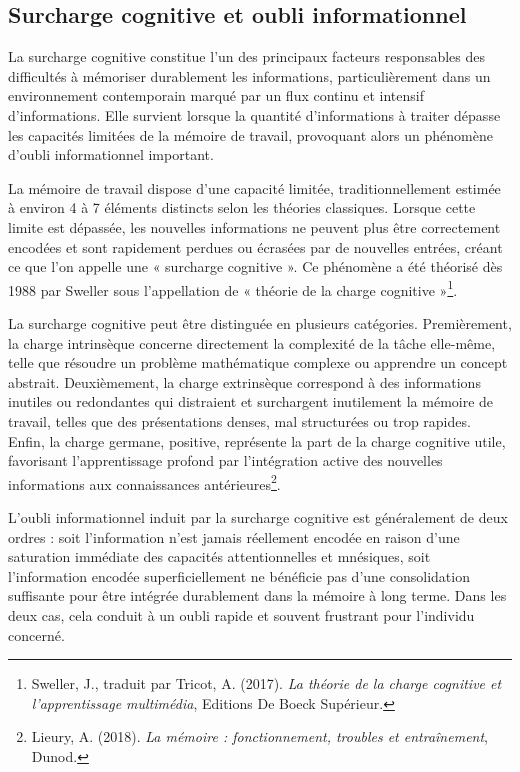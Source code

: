 \documentclass[11pt,a4paper]{report}
\begin{document}
\subsection{Surcharge cognitive et oubli informationnel}
La surcharge cognitive constitue l’un des principaux facteurs responsables des difficultés à mémoriser durablement les informations, particulièrement dans un environnement contemporain marqué par un flux continu et intensif d’informations. Elle survient lorsque la quantité d’informations à traiter dépasse les capacités limitées de la mémoire de travail, provoquant alors un phénomène d’oubli informationnel important.

La mémoire de travail dispose d’une capacité limitée, traditionnellement estimée à environ 4 à 7 éléments distincts selon les théories classiques. Lorsque cette limite est dépassée, les nouvelles informations ne peuvent plus être correctement encodées et sont rapidement perdues ou écrasées par de nouvelles entrées, créant ce que l'on appelle une « surcharge cognitive ». Ce phénomène a été théorisé dès 1988 par Sweller sous l’appellation de « théorie de la charge cognitive »\footnote{Sweller, J., traduit par Tricot, A. (2017). \textit{La théorie de la charge cognitive et l'apprentissage multimédia}, Editions De Boeck Supérieur.}.

La surcharge cognitive peut être distinguée en plusieurs catégories. Premièrement, la charge intrinsèque concerne directement la complexité de la tâche elle-même, telle que résoudre un problème mathématique complexe ou apprendre un concept abstrait. Deuxièmement, la charge extrinsèque correspond à des informations inutiles ou redondantes qui distraient et surchargent inutilement la mémoire de travail, telles que des présentations denses, mal structurées ou trop rapides. Enfin, la charge germane, positive, représente la part de la charge cognitive utile, favorisant l’apprentissage profond par l’intégration active des nouvelles informations aux connaissances antérieures\footnote{Lieury, A. (2018). \textit{La mémoire : fonctionnement, troubles et entraînement}, Dunod.}.

L'oubli informationnel induit par la surcharge cognitive est généralement de deux ordres : soit l’information n’est jamais réellement encodée en raison d'une saturation immédiate des capacités attentionnelles et mnésiques, soit l’information encodée superficiellement ne bénéficie pas d'une consolidation suffisante pour être intégrée durablement dans la mémoire à long terme. Dans les deux cas, cela conduit à un oubli rapide et souvent frustrant pour l’individu concerné.
\end{document}
